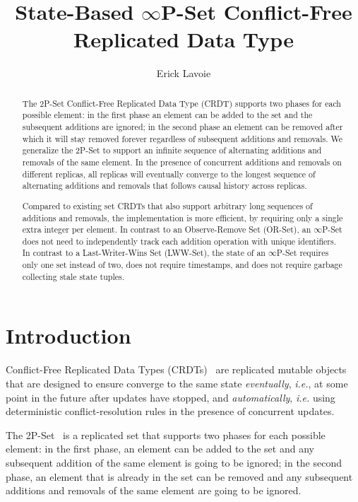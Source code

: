 \documentclass[11pt, oneside]{article}   	%
\title{State-Based $\infty$P-Set Conflict-Free Replicated Data Type}
\author{Erick Lavoie}
\begin{document}
\maketitle


\begin{abstract}
The 2P-Set Conflict-Free Replicated Data Type (CRDT) supports two phases for each possible element: in the first phase an element can be added to the set and the subsequent additions are ignored; in the second phase an element can be removed after which it will stay removed forever regardless of subsequent additions and removals. We generalize the 2P-Set to support an infinite sequence of alternating additions and removals of the same element. In the presence of concurrent additions and removals on different replicas, all replicas will eventually converge to the longest sequence of alternating additions and removals that follows causal history across replicas. 

Compared to existing set CRDTs that also support arbitrary long sequences of additions and removals, the implementation is more efficient, by requiring only a single extra integer per element. In contrast to an Observe-Remove Set (OR-Set), an $\infty$P-Set does not need to  independently track each addition operation with unique identifiers. In contrast to a Last-Writer-Wins Set (LWW-Set), the state of an $\infty$P-Set requires only one set instead of two, does not require timestamps, and does not require garbage collecting stale state tuples.
\end{abstract}

\section{Introduction}

Conflict-Free Replicated Data Types (CRDTs)~\cite{shapiro:hal-00932836} are replicated mutable objects that are designed to ensure converge to the same state \textit{eventually}, \textit{i.e.}, at some point in the future after updates have stopped, and \textit{automatically}, \textit{i.e.} using deterministic conflict-resolution rules in the presence of concurrent updates. 

The 2P-Set~\cite{shapiro:inria-00555588} is a replicated set that supports two phases for each possible element: in the first phase, an element can be added to the set and any subsequent addition of the same element is going to be ignored; in the second phase, an element that is already in the set can be removed and any subsequent additions and removals of the same element are going to be ignored.
\end{document}

